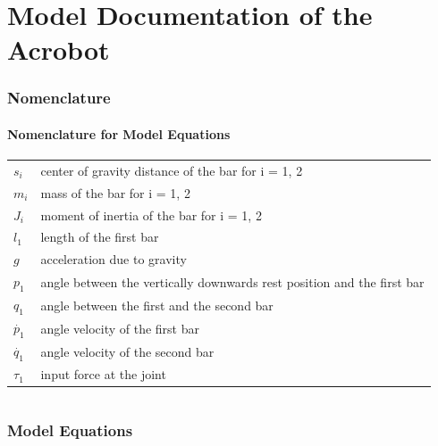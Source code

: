 \documentclass[10pt,a4paper]{article}
\begin{document}
	\part*{Model Documentation of the \\ Acrobot} %
	
	
	\section{Nomenclature} %
	\subsection{Nomenclature for Model Equations} %
	
	\begin{tabular}{ll}
		$s_i$ & center of gravity distance of the bar for i = 1, 2 \\
		$m_i$ & mass of the bar for i = 1, 2 \\
		$J_i$ & moment of inertia of the bar for i = 1, 2 \\
		$l_1$ & length of the first bar \\
		$g$ & acceleration due to gravity \\
		$p_1$ & angle between the vertically downwards rest position and the first bar \\
		$q_1$ & angle between the first and the second bar \\
		$\dot{p_1}$ & angle velocity of the first bar \\
		$\dot{q_1}$ & angle velocity of the second bar \\
		$\tau_1$ & input force at the joint \\
				
	\end{tabular}
	 
	
	\begin{tabular}{ll}

	\end{tabular}
	
	
	\section{Model Equations} %
	
\end{document}
